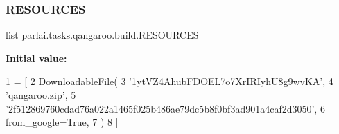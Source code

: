 \subsubsection{\texorpdfstring{R\+E\+S\+O\+U\+R\+C\+ES}{RESOURCES}}
{\footnotesize\ttfamily list parlai.\+tasks.\+qangaroo.\+build.\+R\+E\+S\+O\+U\+R\+C\+ES}

{\bfseries Initial value\+:}
\begin{DoxyCode}
1 =  [
2     DownloadableFile(
3         \textcolor{stringliteral}{'1ytVZ4AhubFDOEL7o7XrIRIyhU8g9wvKA'},
4         \textcolor{stringliteral}{'qangaroo.zip'},
5         \textcolor{stringliteral}{'2f512869760cdad76a022a1465f025b486ae79dc5b8f0bf3ad901a4caf2d3050'},
6         from\_google=\textcolor{keyword}{True},
7     )
8 ]
\end{DoxyCode}
